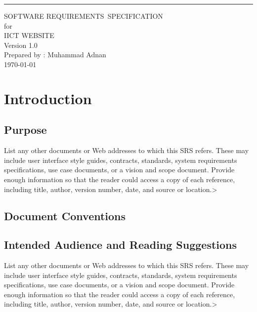 \documentclass{scrreprt}
\date{}
\def\myversion{1.0}}
\begin{document}
    
    \begin{flushright}
        \rule{16cm}{5pt}\vskip1cm
        \begin{bfseries}
            \Huge{SOFTWARE REQUIREMENTS\ SPECIFICATION}\
            \vspace{1.5cm} 
            \\for\\
            \vspace{1.5cm}
            IICT WEBSITE\\
            \vspace{1.5cm}
            \LARGE{Version \myversion}\\
            \vspace{1.5cm}
            Prepared by : Muhammad Adnan\\ 
            \vspace{1.5cm}
            \today\
        \end{bfseries}
    \end{flushright}
    
    
    \tableofcontents
    
    \chapter{Introduction} 
    \section{Purpose}
    List any other documents or Web addresses to which this SRS refers. These may include user interface style guides, contracts, standards, system requirements specifications, use case documents, or a vision and scope document. Provide enough information so that the reader could access a copy of each reference, including title, author, version number, date, and source or location.>
    \section{Document Conventions} 
    \section{Intended Audience and Reading Suggestions}
    List any other documents or Web addresses to which this SRS refers. These may include user interface style guides, contracts, standards, system requirements specifications, use case documents, or a vision and scope document. Provide enough information so that the reader could access a copy of each reference, including title, author, version number, date, and source or location.>
\end{document}
